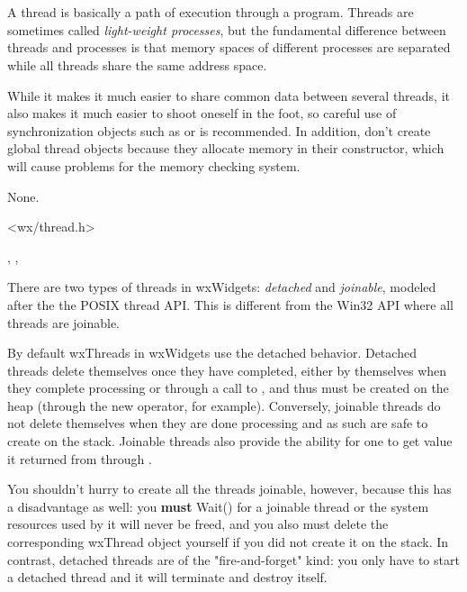 \section{}\label{wxthread}

A thread is basically a path of execution through a program. Threads are
sometimes called {\it light-weight processes}, but the fundamental difference
between threads and processes is that memory spaces of different processes are
separated while all threads share the same address space. 

While it makes it much easier to share common data between several threads, it also 
makes it much easier to shoot oneself in the foot, so careful use of synchronization 
objects such as  or  is recommended. In addition, don't create global thread 
objects because they allocate memory in their constructor, which will cause 
problems for the memory checking system.


None.


<wx/thread.h>


, , 


\label{typeswxthread}

There are two types of threads in wxWidgets: {\it detached} and {\it joinable},
modeled after the the POSIX thread API. This is different from the Win32 API
where all threads are joinable. 

By default wxThreads in wxWidgets use the detached behavior. Detached threads
delete themselves once they have completed, either by themselves when they complete 
processing or through a call to , and thus 
must be created on the heap (through the new operator, for example). Conversely, 
joinable threads do not delete themselves when they are done processing and as such
are safe to create on the stack. Joinable threads also provide the ability
for one to get value it returned from 
through .

You shouldn't hurry to create all the threads joinable, however, because this
has a disadvantage as well: you {\bf must} Wait() for a joinable thread or the
system resources used by it will never be freed, and you also must delete the
corresponding wxThread object yourself if you did not create it on the stack. In 
contrast, detached threads are of the "fire-and-forget" kind: you only have to start 
a detached thread and it will terminate and destroy itself.

